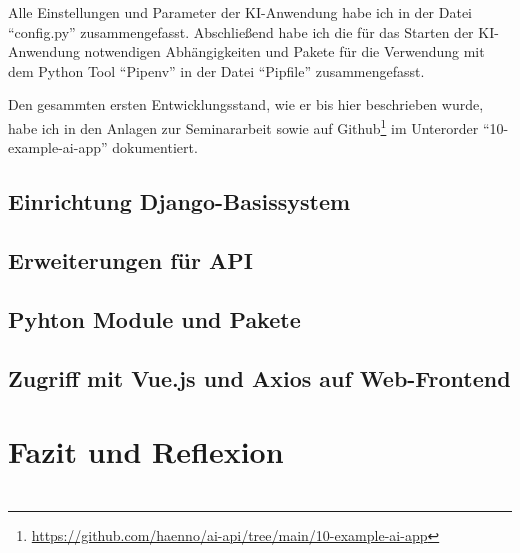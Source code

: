 \documentclass[12pt,oneside,titlepage,listof=totoc,bibliography=totoc]{scrartcl}
\begin{document}
Alle Einstellungen und Parameter der KI-Anwendung habe ich in der Datei \enquote{config.py} zusammengefasst. Abschließend habe ich die für das Starten der KI-Anwendung notwendigen Abhängigkeiten und Pakete für die Verwendung mit dem Python Tool \enquote{Pipenv} in der Datei \enquote{Pipfile} zusammengefasst.

Den gesammten ersten Entwicklungsstand, wie er bis hier beschrieben wurde, habe ich in den Anlagen zur Seminararbeit sowie auf Github\footnote{\url{https://github.com/haenno/ai-api/tree/main/10-example-ai-app}} im Unterorder \enquote{10-example-ai-app} dokumentiert.

\subsection{Einrichtung Django-Basissystem }
\subsection{Erweiterungen für API}
 
\subsection{Pyhton Module und Pakete}
\subsection{Zugriff mit Vue.js und Axios auf Web-Frontend}

\section{Fazit und Reﬂexion}




\newpage
\section*{\AppendixName} %
\end{document}
